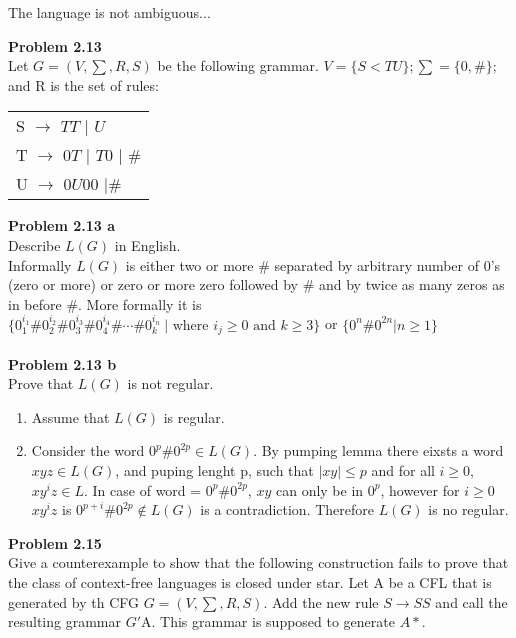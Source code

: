 \documentclass{article}
\newcommand{\problem}[1]{\large{\textbf{Problem #1} \\}}
\begin{document}
The language is not ambiguous... \\

\pagebreak

\problem{2.13}
Let $G = (V, \sum, R, S)$ be the following grammar. $V = \{S<T U\}; \sum = \{0,\#\};$ and R is the set of rules:
\begin{table}[h!]
\centering
\begin{tabular}{l}
S $\rightarrow$ $TT$ $|$ $U$ \\
T $\rightarrow$ $0T$ $|$ $T0$ $|$ $\#$   \\
U $\rightarrow$  $0U00$ $|\#$
\end{tabular}
\end{table}

\vspace{0.2cm}

\problem{2.13 a}
Describe $L(G)$ in English. \\

Informally $L(G)$ is either two or more $\#$ separated by arbitrary number of 0's (zero or more)
or zero or more zero followed by $\#$ and by twice as many zeros as in before $\#$. 
More formally it is $\{0^{i_1}_1\#0^{i_2}_2\#0^{i_3}_3\#0^{i_4}_4\#\cdots\#0^{i_n}_k\ |
\text{ where } i_j \geq 0 \text{ and } k \geq 3 \}$ or $\{0^n \# 0^{2n} | n \geq 1\}$ \\ \\

\problem{2.13 b}
Prove that $L(G)$ is not regular. \\

\begin{enumerate}[\underline{Case} 1., leftmargin = 1.5cm]
\itemsep0em
\item Assume that $L(G)$ is regular.
\item Consider the word $0^p\#0^{2p} \in L(G)$. By pumping lemma there eixsts a word $xyz \in L(G)$, and puping
lenght p, such that $|xy| \leq p$ and for all $i \geq 0$, $xy^iz \in L$. In case of word = $0^p \# 0^{2p}$, $xy$
can only be in $0^p$, however for $i \geq 0$ $xy^iz$ is $0^{p+i} \# 0^{2p} \notin L(G)$ is a contradiction. Therefore
$L(G)$ is no regular.
\end{enumerate}

\problem{2.15}
Give a counterexample to show that the following construction fails to prove that the class of context-free languages is closed under star.
Let A be a CFL that is generated by th CFG $G = (V,\sum,R,S)$. Add the new rule $S \rightarrow SS$ and call the
resulting grammar $G'$A. This grammar is supposed to generate $A*$. \\
\end{document}
